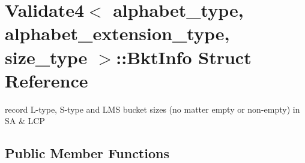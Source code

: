 \hypertarget{struct_validate4_1_1_bkt_info}{}\section{Validate4$<$ alphabet\+\_\+type, alphabet\+\_\+extension\+\_\+type, size\+\_\+type $>$\+:\+:Bkt\+Info Struct Reference}
\label{struct_validate4_1_1_bkt_info}


record L-\/type, S-\/type and L\+MS bucket sizes (no matter empty or non-\/empty) in SA \& L\+CP  


\subsection*{Public Member Functions}
